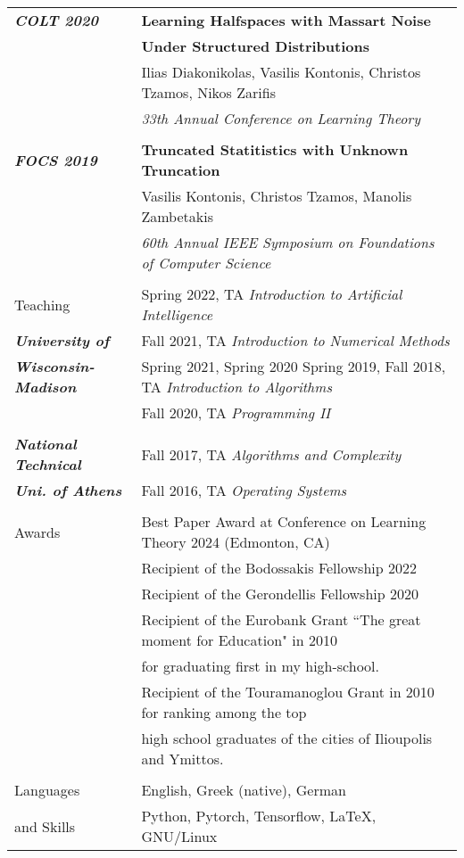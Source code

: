 \documentclass[letterpaper,11pt,oneside]{article}
\begin{document}
\begin{longtable}{@{} l l}
\emph{\textbf{COLT 2020}}
     &\textbf{Learning Halfspaces with Massart Noise}\\
     &\textbf{Under Structured Distributions}\\
     & Ilias Diakonikolas, Vasilis Kontonis, Christos Tzamos, Nikos Zarifis \\
     & \emph{33th Annual Conference on Learning Theory} \\
     & \\

\emph{\textbf{FOCS 2019}}
     & \textbf{Truncated Statitistics with Unknown Truncation} \\
     & Vasilis Kontonis, Christos Tzamos, Manolis Zambetakis\\
     & \emph{60th Annual IEEE Symposium on Foundations of Computer Science} \\
     & \\


  \Large{Teaching}

  & Spring 2022, TA \emph{Introduction to Artificial Intelligence} \\
  \emph{\textbf{University of}}
  & Fall 2021, TA \emph{Introduction to Numerical Methods} \\
  \emph{\textbf{Wisconsin-Madison}}
  & Spring 2021, Spring 2020 Spring 2019, Fall 2018, TA \emph{Introduction to Algorithms}\\
  & Fall 2020, TA \emph{Programming II}\\
   & \\
   \emph{\textbf{National Technical }}
  & Fall 2017, TA  \emph{Algorithms and Complexity}  \\
  \emph{\textbf{Uni. of Athens} }
  & Fall 2016, TA \emph{Operating Systems}  \\
  & \\


\Large{Awards}

 & Best Paper Award at Conference on Learning Theory 2024 (Edmonton, CA) \\

 & Recipient of the Bodossakis Fellowship 2022 \\

 & Recipient of the Gerondellis Fellowship 2020 \\

 & Recipient of the Eurobank Grant ``The great moment for Education" in 2010\\
 & for graduating first in my high-school. \\

 & Recipient of the Touramanoglou Grant in 2010 for ranking among the top \\
 & high school graduates of the cities of Ilioupolis and Ymittos. \\
 &\\

  \Large{Languages}   & English, Greek (native), German \\
\Large{and Skills}    & Python, Pytorch, Tensorflow, \LaTeX, GNU/Linux\\

\end{longtable}
\end{document}
